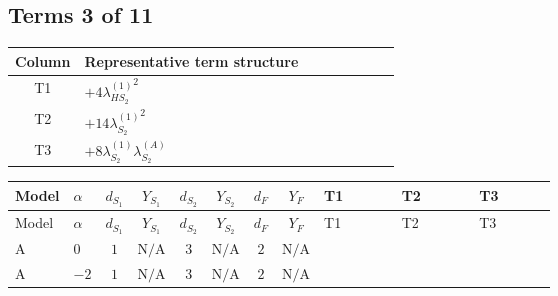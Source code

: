 \documentclass[8pt]{article}
\begin{document}
\begin{landscape}
\subsection*{Terms 3 of 11}
\begin{center}
\begin{tabular}{@{}c >{\raggedright\arraybackslash}p{0.82\linewidth}@{}}
\toprule
Column & Representative term structure \\
\midrule
T1 & \(\displaystyle +4 {\lambda_{HS_2}^{(1)}}^2\) \\
\midrule
T2 & \(\displaystyle +14 {\lambda_{S_2}^{(1)}}^2\) \\
\midrule
T3 & \(\displaystyle +8 {\lambda_{S_2}^{(1)}} {\lambda_{S_2}^{(A)}}\) \\
\midrule
\bottomrule
\end{tabular}
\end{center}
\smallskip
\tiny
\begin{longtable}{@{}llcccccc >{\raggedright\arraybackslash}p{0.21\linewidth} >{\raggedright\arraybackslash}p{0.21\linewidth} >{\raggedright\arraybackslash}p{0.21\linewidth}@{}}
\toprule
Model & $\alpha$ & $d_{S_1}$ & $Y_{S_1}$ & $d_{S_2}$ & $Y_{S_2}$ & $d_F$ & $Y_F$ & T1 & T2 & T3 \\
\midrule
\endfirsthead
\toprule
Model & $\alpha$ & $d_{S_1}$ & $Y_{S_1}$ & $d_{S_2}$ & $Y_{S_2}$ & $d_F$ & $Y_F$ & T1 & T2 & T3 \\
\midrule
\endhead
A & $0$ & $1$ & $\text{N/A}$ & $3$ & $\text{N/A}$ & $2$ & $\text{N/A}$ & \scriptsize\adjustbox{max width=\linewidth}{$\begin{gathered} +4 {\lambda_{HS_2}^{(1)}}^2\end{gathered}$} & \scriptsize\adjustbox{max width=\linewidth}{$\begin{gathered} +14 {\lambda_{S_2}^{(1)}}^2\end{gathered}$} & \scriptsize\adjustbox{max width=\linewidth}{$\begin{gathered} +8 {\lambda_{S_2}^{(1)}} {\lambda_{S_2}^{(A)}}\end{gathered}$} \\
\midrule
A & $-2$ & $1$ & $\text{N/A}$ & $3$ & $\text{N/A}$ & $2$ & $\text{N/A}$ & \scriptsize\adjustbox{max width=\linewidth}{$\begin{gathered} +4 {\lambda_{HS_2}^{(1)}}^2\end{gathered}$} & \scriptsize\adjustbox{max width=\linewidth}{$\begin{gathered} +14 {\lambda_{S_2}^{(1)}}^2\end{gathered}$} & \scriptsize\adjustbox{max width=\linewidth}{$\begin{gathered} +8 {\lambda_{S_2}^{(1)}} {\lambda_{S_2}^{(A)}}\end{gathered}$} \\

\end{longtable}
\end{landscape}
\end{document}
